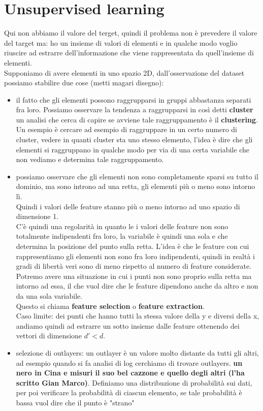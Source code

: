\documentclass[12pt, oneside]{extbook}
\begin{document}
\section{Unsupervised learning}
Qui non abbiamo il valore del terget, quindi il problema non è prevedere il valore del target ma: ho un insieme di valori di elementi e in qualche modo voglio riuscire ad estrarre dell'informazione che viene rappresentata da quell'insieme di elementi.\\Supponiamo di avere elementi in uno spazio 2D, dall'osservazione del dataset possiamo stabilire due cose (metti magari disegno):
\begin{itemize}
	\item il fatto che gli elementi possono raggrupparsi in gruppi abbastanza separati fra loro. Possiamo osservare la tendenza a raggrupparsi in così detti \textbf{cluster} un analisi che cerca di capire se avviene tale raggruppamento è il \textbf{clustering}.\\Un esempio è cercare ad esempio di raggruppare in un certo numero di cluster, vedere in quanti cluster sta uno stesso elemento, l'idea è dire che gli elementi si raggruppano in qualche modo per via di una certa variabile che non vediamo e determina tale raggruppamento.
	\item possiamo osservare che gli elementi non sono completamente sparsi su tutto il dominio, ma sono introno ad una retta, gli elementi più o meno sono intorno lì.\\Quindi i valori delle feature stanno più o meno intorno ad uno spazio di dimensione 1.\\C'è quindi una regolarità in quanto le i valori delle feature non sono totalmente indipendenti fra loro, la variabile è quindi una sola e che determina la posizione del punto sulla retta. L'idea è che le feature con cui rappresentiamo gli elementi non sono fra loro indipendenti, quindi in realtà i gradi di libertà veri sono di meno rispetto al numero di feature considerate.\\Potremo avere una situazione in cui i punti non sono proprio sulla retta ma intorno ad essa, il che vuol dire che le feature dipendono anche da altro e non da una sola variabile.\\Questo si chiama \textbf{feature selection} o \textbf{feature extraction}.\\Caso limite: dei punti che hanno tutti la stessa valore della y e diversi della x, andiamo quindi ad estrarre un sotto insieme dalle feature ottenendo dei vettori di dimensione $d'< d$.
	\item selezione di outlayers: un outlayer è un valore molto distante da tutti gli altri, ad esempio quando si fa analisi di log cerchiamo di trovare outlayers. \textsf{\textbf{un nero in Cina e misuri il suo bel cazzone e quello degli altri (l'ha scritto Gian Marco)}}. Definiamo una distribuzione di probabilità sui dati, per poi verificare la probabilità di ciascun elemento, se tale probabilità è bassa vuol dire che il punto è "strano" 
\end{itemize}
\end{document}
